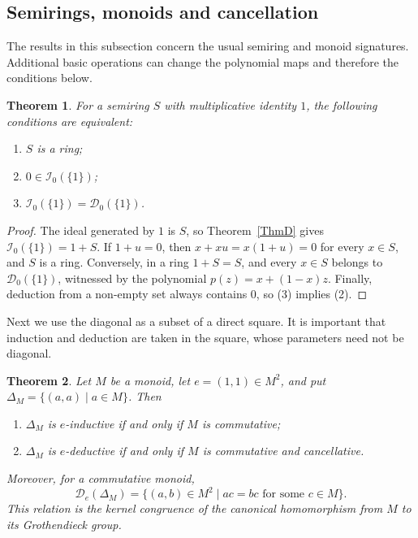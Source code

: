 \documentclass[12pt,english]{amsart}
\newtheorem{theorem}{Theorem}[section]
\theoremstyle{definition}
\numberwithin{equation}{section}
\theoremstyle{remark}
\begin{document}
\subsection{Semirings, monoids and cancellation}\label{SubsecDetectMonoids}

The results in this subsection concern the usual semiring and monoid
signatures. Additional basic operations can change the polynomial maps
and therefore the conditions below.

\begin{theorem}\label{ThmDetectRings}
For a semiring $S$ with multiplicative identity $1$, the following
conditions are equivalent:
\begin{enumerate}
\item $S$ is a ring;
\item $0\in\mathcal I_0(\{1\})$;
\item $\mathcal I_0(\{1\})=\mathcal D_0(\{1\})$.
\end{enumerate}
\end{theorem}

\begin{proof}
The ideal generated by $1$ is $S$, so Theorem~\ref{ThmD} gives
$\mathcal I_0(\{1\})=1+S$. If $1+u=0$, then
$x+xu=x(1+u)=0$ for every $x\in S$, and $S$ is a ring.
Conversely, in a ring $1+S=S$, and every $x\in S$ belongs to
$\mathcal D_0(\{1\})$, witnessed by the polynomial
$p(z)=x+(1-x)z$. Finally, deduction from a non-empty set always
contains $0$, so (3) implies (2).
\end{proof}

Next we use the diagonal as a subset of a direct square. It is
important that induction and deduction are taken in the square,
whose parameters need not be diagonal.

\begin{theorem}\label{ThmDetectMonoidDiagonal}
Let $M$ be a monoid, let $e=(1,1)\in M^2$, and put
$\Delta_M=\{(a,a)\mid a\in M\}$. Then
\begin{enumerate}
\item $\Delta_M$ is $e$-inductive if and only if $M$ is commutative;
\item $\Delta_M$ is $e$-deductive if and only if $M$ is commutative
and cancellative.
\end{enumerate}
Moreover, for a commutative monoid,
\begin{equation}\label{EqDetectGroupCompletion}
\mathcal D_e(\Delta_M)
=\{(a,b)\in M^2\mid ac=bc\text{ for some }c\in M\}.
\end{equation}
This relation is the kernel congruence of the canonical homomorphism
from $M$ to its Grothendieck group.
\end{theorem}
\end{document}
